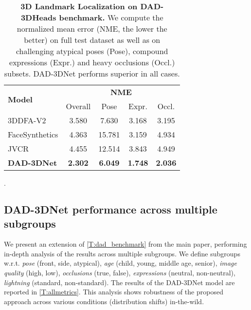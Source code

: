 \documentclass[10pt,twocolumn,letterpaper]{article}
\begin{document}
\begin{table}[t]
\footnotesize
\centering


    \begin{tabular}{@{}l|cccc@{}}
    \toprule \multirow{2}{*}{\textbf{Model}}& 
        \multicolumn{4}{c}{\textbf{NME}{}}\\
                 & {Overall}  &  {Pose}  &  {Expr.}  &  {Occl.} \\\toprule 3DDFA-V2 \cite{guo2020towards}  & 3.580  &  7.630  &  3.168  &  3.195  \\
        FaceSynthetics \cite{wood2021fake}  & 4.363  &  15.781  &  3.159  &  	4.934  \\
        JVCR \cite{jvcr}  & 4.455  &  12.514  &  3.843  &  4.949  \\

        \textbf{DAD-3DNet}
                 & \textbf{2.302}  &  \textbf{6.049}  &  \textbf{1.748}  &  \textbf{2.036}  \\\bottomrule
    \end{tabular}
\caption{\textbf{3D Landmark Localization on DAD-3DHeads benchmark.} We compute the normalized mean error (NME, the lower the better) on full test dataset as well as on challenging atypical poses (Pose), compound expressions (Expr.) and heavy occlusions (Occl.) subsets. DAD-3DNet performs superior in all cases.}.
\label{t:3d_landarks_dad}
\end{table}


 

\subsection{DAD-3DNet performance across multiple subgroups}\label{ssec:distribution_shifts}
We present an extension of \cref{T:dad_benchmark} from the main paper, performing in-depth analysis of the results across multiple subgroups. We define subgroups w.r.t. \emph{pose} (front, side, atypical), \emph{age} (child, young, middle age, senior), \emph{image quality} (high, low), \emph{occlusions} (true, false), \emph{expressions} (neutral, non-neutral), \emph{lightning} (standard, non-standard). The results of the DAD-3DNet model are reported in \cref{T:allmetrics}. This analysis shows robustness of the proposed approach across various conditions (distribution shifts) in-the-wild.
\end{document}
